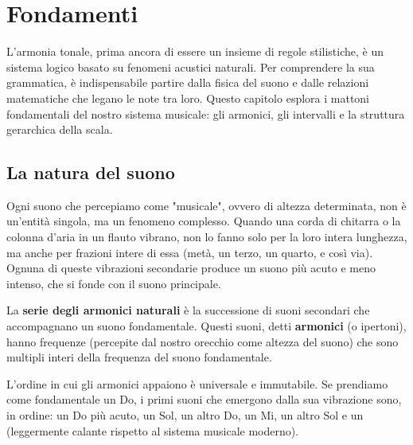 \chapter{Fondamenti}
\label{chap:fondamenti}

L'armonia tonale, prima ancora di essere un insieme di regole stilistiche, è un sistema logico basato su fenomeni acustici naturali. Per comprendere la sua grammatica, è indispensabile partire dalla fisica del suono e dalle relazioni matematiche che legano le note tra loro. Questo capitolo esplora i mattoni fondamentali del nostro sistema musicale: gli armonici, gli intervalli e la struttura gerarchica della scala.

\section{La natura del suono}
\label{sec:natura_suono}

Ogni suono che percepiamo come "musicale", ovvero di altezza determinata, non è un'entità singola, ma un fenomeno complesso. Quando una corda di chitarra o la colonna d'aria in un flauto vibrano, non lo fanno solo per la loro intera lunghezza, ma anche per frazioni intere di essa (metà, un terzo, un quarto, e così via). Ognuna di queste vibrazioni secondarie produce un suono più acuto e meno intenso, che si fonde con il suono principale.

\begin{definizione}
	\label{def:serie_armonici}
	La \textbf{serie degli armonici naturali} è la successione di suoni secondari che accompagnano un suono fondamentale. Questi suoni, detti \textbf{armonici} (o ipertoni), hanno frequenze (percepite dal nostro orecchio come altezza del suono) che sono multipli interi della frequenza del suono fondamentale.
\end{definizione}

L'ordine in cui gli armonici appaiono è universale e immutabile. Se prendiamo come fondamentale un Do, i primi suoni che emergono dalla sua vibrazione sono, in ordine: un Do più acuto, un Sol, un altro Do, un Mi, un altro Sol e un \Sibemolle  (leggermente calante rispetto al sistema musicale moderno).

\begin{esempio}
	\label{ex:serie_armonici_do}
\end{esempio}

